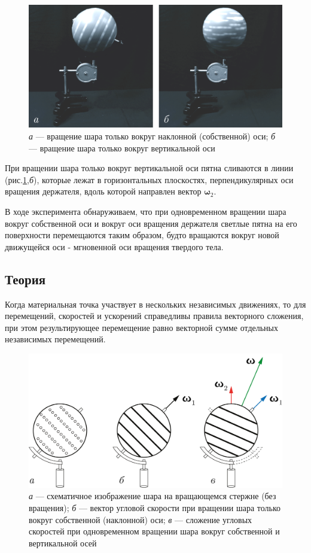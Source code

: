 \documentclass[../../All.tex]{subfiles}
\begin{document}
\begin{figure} 	
	\centering 	
	\includegraphics[width=0.9\linewidth]{angular-2.png}
	\caption{\textit{а} — вращение шара только вокруг наклонной (собственной) оси; \textit{б} — вращение шара только вокруг вертикальной оси}
	\label{angular-2}
\end{figure}

При вращении шара только вокруг вертикальной оси пятна сливаются в линии (рис.\ref{angular-2},\textit{б}), которые лежат в горизонтальных плоскостях, перпендикулярных оси вращения держателя, вдоль которой направлен вектор $ \textbf{ω}_{2} $.

В ходе эксперимента обнаруживаем, что при одновременном вращении шара вокруг собственной оси и вокруг оси вращения держателя светлые пятна на его поверхности перемещаются таким образом, будто вращаются вокруг новой движущейся оси - мгновенной оси вращения твердого тела.

\subsection*{\textcolor{PineGreen}{Теория}}

Когда материальная точка участвует в нескольких независимых движениях, то для перемещений, скоростей и ускорений справедливы правила векторного сложения, при этом результирующее перемещение равно векторной сумме отдельных независимых перемещений.

\begin{figure}[H] 	
	\centering 	
	\includegraphics[width=0.8\linewidth]{angular-3.png}
	\caption{\textit{а} — схематичное изображение шара на вращающемся стержне (без вращения); \textit{б} — вектор угловой скорости при вращении шара только вокруг собственной (наклонной) оси; \textit{в} — сложение угловых скоростей при одновременном вращении шара вокруг собственной и вертикальной осей}
	\label{angular-3}
\end{figure}
\end{document}

